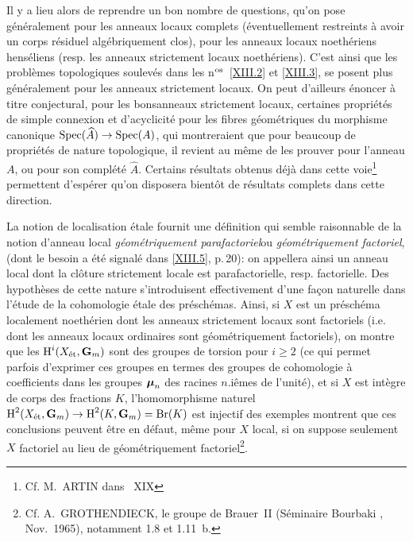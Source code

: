 Il y a lieu alors de reprendre un bon nombre de questions, qu'on pose g\'en\'eralement pour les anneaux locaux complets (\'eventuellement restreints \`a avoir un corps r\'esiduel alg\'ebriquement clos), pour les anneaux locaux noeth\'eriens hens\'eliens (resp. les anneaux strictement locaux noeth\'eriens). C'est ainsi que les probl\`emes topologiques soulev\'es dans les n$^{\textup{os}}$~\ref{XIII.2} et \ref{XIII.3}, se posent plus g\'en\'eralement pour les anneaux strictement locaux. On peut d'ailleurs \'enoncer \`a titre conjectural, pour les \og bons\fg anneaux strictement locaux, certaines propri\'et\'es de simple connexion et d'acyclicit\'e pour les fibres g\'eom\'etriques du morphisme canonique $\Spec(\widehat{A})\to\Spec(A)$, qui montreraient que pour beaucoup de propri\'et\'es de nature \og topologique\fg, il revient au m\^eme de les prouver pour l'anneau $A$, ou pour son compl\'et\'e $\widehat{A}$. Certains r\'esultats obtenus d\'ej\`a dans cette voie\footnote{Cf. M.\, ARTIN dans ~XIX} permettent d'esp\'erer qu'on disposera bient\^{o}t de r\'esultats complets dans cette direction.

\label{commpara}%
La notion de localisation \'etale fournit une d\'efinition qui semble raisonnable de la notion d'anneau local \og \emph{géométriquement parafactoriel}\fg ou \og \emph{géométriquement factoriel}\fg, (dont le besoin a \'et\'e signal\'e dans \numero\ref{XIII.5}, p.\,20): on appellera ainsi un anneau local dont la cl\^{o}ture strictement locale est parafactorielle, resp. factorielle. Des hypoth\`eses de cette nature s'introduisent effectivement d'une fa\c con naturelle dans l'\'etude de la cohomologie \'etale des pr\'esch\'emas. Ainsi, si $X$ est un pr\'esch\'ema localement noeth\'erien dont les anneaux strictement locaux sont factoriels (i.e. dont les anneaux locaux ordinaires sont \og g\'eom\'etriquement factoriels{\fg}), on montre que les $\operatorname{H}^i(X_{{\textup{ét}}}, \mathbf{G}_m)$ sont des groupes de torsion pour $i\geq 2$ (ce qui permet parfois d'exprimer ces groupes en termes des groupes de cohomologie \`a coefficients dans les groupes $\boldsymbol{\mu}_n$ des racines $n$.i{\^emes} de l'unit\'e), et si $X$ est int\`egre de corps des fractions $K$, l'homomorphisme naturel $\H^2(X_{{\textup{ét}}}, \GG_m)\to\H^2(K, \GG_m)=\Br(K)$ est injectif des exemples montrent que ces conclusions peuvent \^etre en d\'efaut, m\^eme pour $X$ local, si on suppose seulement $X$ factoriel au lieu de g\'eom\'etriquement factoriel\footnote{Cf. A.\, GROTHENDIECK, le groupe de Brauer~II (S\'eminaire Bourbaki , Nov.~1965), notamment 1.8 et 1.11~b.}.


